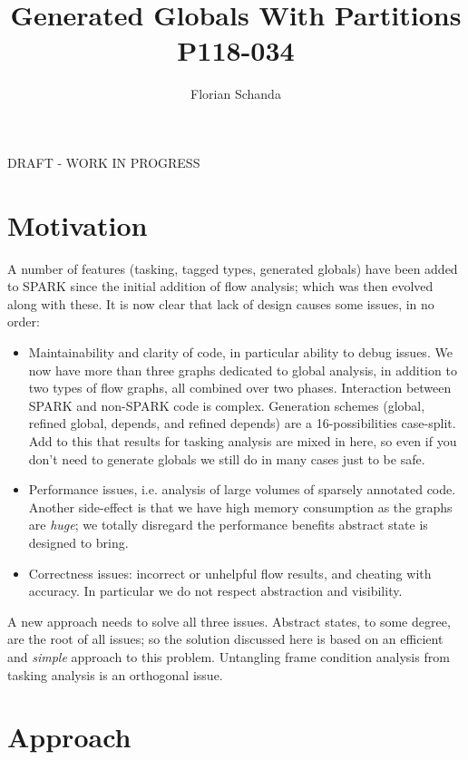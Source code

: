 \documentclass{article}
\author{Florian Schanda}
\title{Generated Globals With Partitions\\P118-034}
\begin{document}
\maketitle

\begin{center}
  \color{red} DRAFT - WORK IN PROGRESS
\end{center}

\section{Motivation}
A number of features (tasking, tagged types, generated globals) have been
added to SPARK since the initial addition of flow analysis; which was then
evolved along with these. It is now clear that lack of design causes some
issues, in no order:
\begin{itemize}
\item Maintainability and clarity of code, in particular ability to debug
  issues. We now have more than three graphs dedicated to global analysis,
  in addition to two types of flow graphs, all combined over two phases.
  Interaction between SPARK and non-SPARK code is complex. Generation
  schemes (global, refined global, depends, and refined depends) are a
  16-possibilities case-split. Add to this that results for tasking
  analysis are mixed in here, so even if you don't need to generate globals
  we still do in many cases just to be safe.

\item Performance issues, i.e. analysis of large volumes of sparsely
  annotated code. Another side-effect is that we have high memory
  consumption as the graphs are \emph{huge}; we totally disregard the
  performance benefits abstract state is designed to bring.

\item Correctness issues: incorrect or unhelpful flow results, and cheating
  with accuracy. In particular we do not respect abstraction and
  visibility.
\end{itemize}

A new approach needs to solve all three issues. Abstract states, to some
degree, are the root of all issues; so the solution discussed here is based
on an efficient and \emph{simple} approach to this problem. Untangling
frame condition analysis from tasking analysis is an orthogonal issue.

\pagebreak
\section{Approach}
\end{document}

